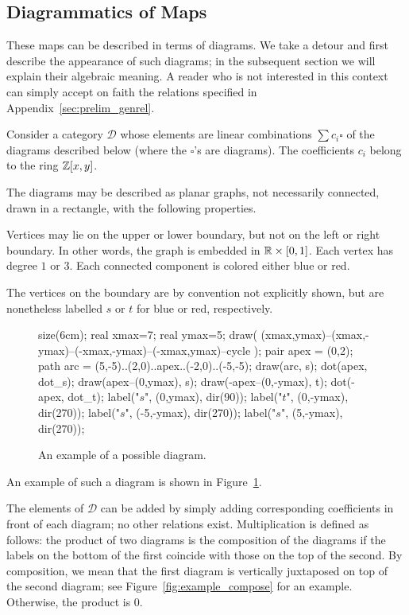 \subsection{Diagrammatics of Maps}
\label{sec:prelim_map}
\newcommand{\DD}{\mathcal D}
These maps can be described in terms of diagrams.  We take a detour and first describe the appearance of such diagrams; in the subsequent section we will explain their algebraic meaning.  A reader who is not interested in this context can simply accept on faith the relations specified in Appendix~\ref{sec:prelim_genrel}.

Consider a category $\DD$ whose elements are linear combinations $\sum c_i \square$ of the diagrams described below (where the $\square$'s are diagrams).  The coefficients $c_i$ belong to the ring $\mathbb Z[x,y]$.

The diagrams may be described as planar graphs, not necessarily connected, drawn in a rectangle, with the following properties.
\begin{enumerate}[(i)]
	\ii Vertices may lie on the upper or lower boundary, but not on the left or right boundary.  In other words, the graph is embedded in $\mathbb R \times [0,1]$.
	\ii Each vertex has degree $1$ or $3$.
	\ii Each connected component is colored either blue or red.
\end{enumerate}
The vertices on the boundary are by convention not explicitly shown, but are nonetheless labelled $s$ or $t$ for blue or red, respectively.

\begin{figure}[ht]
	\centering
	\begin{asy}
	size(6cm);
	real xmax=7;
	real ymax=5;
	draw( (xmax,ymax)--(xmax,-ymax)--(-xmax,-ymax)--(-xmax,ymax)--cycle );
	pair apex = (0,2);
	path arc = (5,-5)..(2,0)..apex..(-2,0)..(-5,-5);
	draw(arc, s);
	dot(apex, dot_s);
	draw(apex--(0,ymax), s);
	draw(-apex--(0,-ymax), t);
	dot(-apex, dot_t);
	label("$s$", (0,ymax), dir(90));
	label("$t$", (0,-ymax), dir(270));
	label("$s$", (-5,-ymax), dir(270));
	label("$s$", (5,-ymax), dir(270));
	\end{asy}
	\caption{An example of a possible diagram.}
	\label{fig:example_diagram}
\end{figure}

An example of such a diagram is shown in Figure~\ref{fig:example_diagram}.

The elements of $\DD$ can be added by simply adding corresponding coefficients in front of each diagram; no other relations exist.  Multiplication is defined as follows: the product of two diagrams is the composition of the diagrams if the labels on the bottom of the first coincide with those on the top of the second.  By composition, we mean that the first diagram is vertically juxtaposed on top of the second diagram; see Figure~\ref{fig:example_compose} for an example.  Otherwise, the product is $0$.

